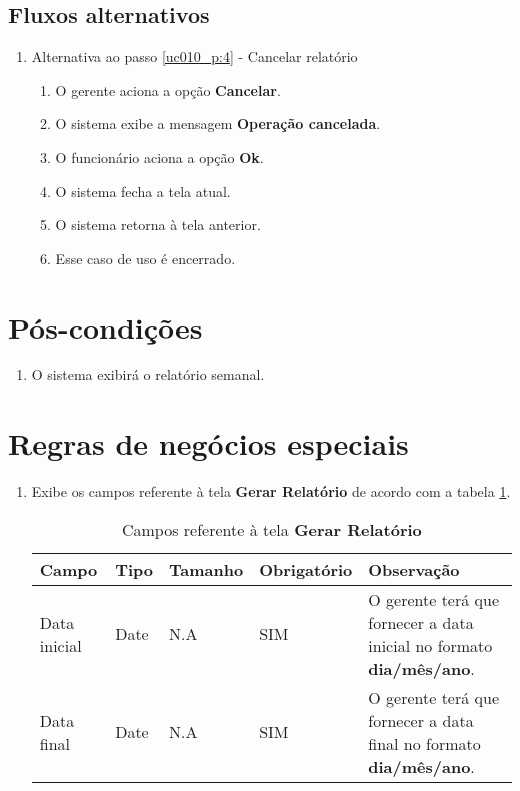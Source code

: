 \subsection{Fluxos alternativos}

\begin{enumerate}[label=A\arabic*]	
	\item Alternativa ao passo \ref{uc010_p:4} - Cancelar relatório \label{uc010_a:1}
	\begin{enumerate}[label*=.\arabic*]
		\item O gerente aciona a opção \textbf{Cancelar}.
		\item O sistema exibe a mensagem \textbf{Operação cancelada}.
		\item O funcionário aciona a opção \textbf{Ok}.
		\item O sistema fecha a tela atual.
		\item O sistema retorna à tela anterior.
		\item Esse caso de uso é encerrado.
	\end{enumerate}			 	
\end{enumerate}

\section{Pós-condições}

\begin{enumerate}
	\item O sistema exibirá o relatório semanal.	
\end{enumerate}

\section{Regras de negócios especiais}

\begin{enumerate}[label=RN\arabic*]
	\item Exibe os campos referente à tela \textbf{Gerar Relatório} de acordo com a tabela \ref{uc010_tb_rn1}. \label{uc010_rn:1}
	\begin{table}[htb]
		\ABNTEXfontereduzida
		\caption[Campos referente à tela \textbf{Gerar Relatório}]{Campos referente à tela \textbf{Gerar Relatório}}
		\label{uc010_tb_rn1}
		\begin{tabular}{|p{3.0cm}|p{2.0cm}|p{1.5cm}|p{2.0cm}|p{5.75cm}|}
			\hline
			\textbf{Campo} & \textbf{Tipo} & \textbf{Tamanho} & \textbf{Obrigatório} & \textbf{Observação}                                                         \\ \hline
			Data inicial   & Date          & N.A              & SIM                  & O gerente terá que fornecer a data inicial no formato \textbf{dia/mês/ano}. \\ \hline
			Data final     & Date          & N.A              & SIM                  & O gerente terá que fornecer a data final no formato \textbf{dia/mês/ano}.   \\ \hline
		\end{tabular}
	\end{table}
\end{enumerate}